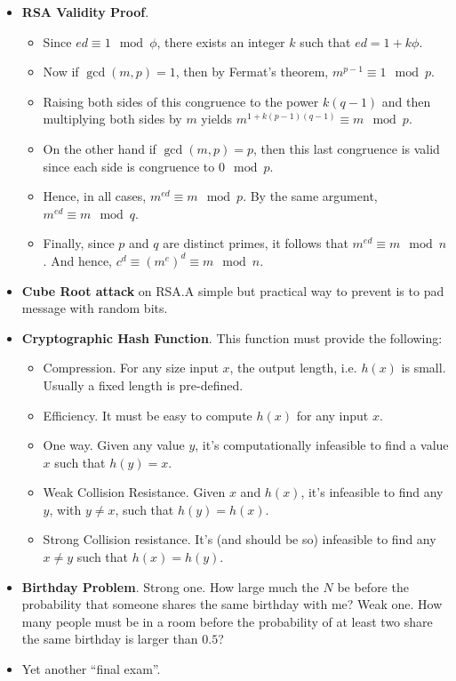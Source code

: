 \documentclass[twocolumn]{article}
\begin{document}
\begin{itemize}
\begin{algorithm}
  \end{algorithm}
\item \textbf{RSA Validity Proof}.
  \begin{itemize}
  \item Since $ed\equiv 1\mod\phi$, there exists an integer $k$ such
    that $ed=1+k\phi$. 
  \item Now if $\gcd(m,p)=1$, then by Fermat's theorem, $m^{p-1}\equiv
    1\mod p$. 
  \item Raising both sides of this congruence to the power $k(q-1)$
    and then multiplying both sides by $m$ yields
    $m^{1+k(p-1)(q-1)}\equiv m\mod p$.
  \item On the other hand if $\gcd(m,p)=p$, then this last congruence
    is valid since each side is congruence to $0\mod p$. 
  \item Hence, in all cases, $m^{ed}\equiv m\mod p$. By the same
    argument, $m^{ed}\equiv m\mod q$. 
  \item Finally, since $p$ and $q$ are distinct primes, it follows
    that $m^{ed}\equiv m\mod n$. And hence, $c^{d}\equiv
    {(m^{e})}^{d}\equiv m\mod n$.
  \end{itemize}
\item \textbf{Cube Root attack} on RSA.\@ A simple but practical way to
  prevent is to pad message with random bits.
\item \textbf{Cryptographic Hash Function}. This function must provide
  the following:
  \begin{itemize}
  \item Compression. For any size input $x$, the output length,
    i.e. $h(x)$ is small. Usually a fixed length is pre-defined.
  \item Efficiency. It must be easy to compute $h(x)$ for any input
    $x$. 
  \item One way. Given any value $y$, it's computationally infeasible
    to find a value $x$ such that $h(y)=x$.
  \item Weak Collision Resistance. Given $x$ and $h(x)$, it's
    infeasible to find any $y$, with $y\neq x$, such that
    $h(y)=h(x)$.
  \item Strong Collision resistance. It's (and should be so)
    infeasible to find any $x\neq y$ such that $h(x)=h(y)$.
  \end{itemize}
\item \textbf{Birthday Problem}. Strong one. How large much the $N$ be
  before the probability that someone shares the same birthday with
  me? Weak one. How many people must be in a room before the
  probability of at least two share the same birthday is larger than
  $0.5$?  
\item Yet another ``final exam''.
\end{itemize}
\end{document}
